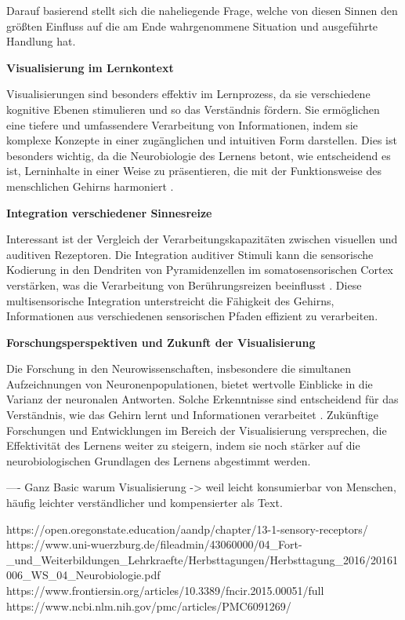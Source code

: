 Darauf basierend stellt sich die naheliegende Frage, welche von diesen Sinnen den größten Einfluss auf die am Ende wahrgenommene Situation und ausgeführte Handlung hat. 


\textbf{Visualisierung im Lernkontext}

Visualisierungen sind besonders effektiv im Lernprozess, da sie verschiedene kognitive Ebenen stimulieren und so das Verständnis fördern. Sie ermöglichen eine tiefere und umfassendere Verarbeitung von Informationen, indem sie komplexe Konzepte in einer zugänglichen und intuitiven Form darstellen. Dies ist besonders wichtig, da die Neurobiologie des Lernens betont, wie entscheidend es ist, Lerninhalte in einer Weise zu präsentieren, die mit der Funktionsweise des menschlichen Gehirns harmoniert \cite{UllmannMentalRepresentation}.

\textbf{Integration verschiedener Sinnesreize}

Interessant ist der Vergleich der Verarbeitungskapazitäten zwischen visuellen und auditiven Rezeptoren. Die Integration auditiver Stimuli kann die sensorische Kodierung in den Dendriten von Pyramidenzellen im somatosensorischen Cortex verstärken, was die Verarbeitung von Berührungsreizen beeinflusst \cite{NatureCommunications}. Diese multisensorische Integration unterstreicht die Fähigkeit des Gehirns, Informationen aus verschiedenen sensorischen Pfaden effizient zu verarbeiten.

\textbf{Forschungsperspektiven und Zukunft der Visualisierung}

Die Forschung in den Neurowissenschaften, insbesondere die simultanen Aufzeichnungen von Neuronenpopulationen, bietet wertvolle Einblicke in die Varianz der neuronalen Antworten. Solche Erkenntnisse sind entscheidend für das Verständnis, wie das Gehirn lernt und Informationen verarbeitet \cite{FrontiersInNeuroscience}. Zukünftige Forschungen und Entwicklungen im Bereich der Visualisierung versprechen, die Effektivität des Lernens weiter zu steigern, indem sie noch stärker auf die neurobiologischen Grundlagen des Lernens abgestimmt werden.


---- Ganz Basic warum Visualisierung -> weil leicht konsumierbar von Menschen, häufig leichter verständlicher und kompensierter als Text. 

https://open.oregonstate.education/aandp/chapter/13-1-sensory-receptors/
https://www.uni-wuerzburg.de/fileadmin/43060000/04\_Fort-\_und\_Weiterbildungen\_Lehrkraefte/Herbsttagungen/Herbsttagung\_2016/20161006\_WS\_04\_Neurobiologie.pdf
https://www.frontiersin.org/articles/10.3389/fncir.2015.00051/full
https://www.ncbi.nlm.nih.gov/pmc/articles/PMC6091269/


